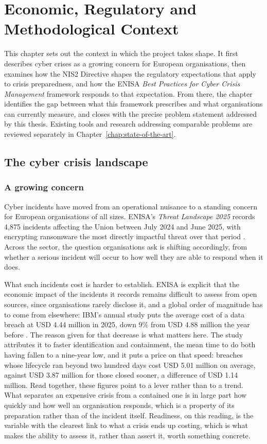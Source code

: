 \chapter{Economic, Regulatory and Methodological Context}
\label{chap:context}

This chapter sets out the context in which the project takes shape. It first
describes cyber crises as a growing concern for European organisations, then
examines how the NIS2 Directive shapes the regulatory expectations that apply
to crisis preparedness, and how the ENISA \emph{Best Practices for Cyber
Crisis Management} framework responds to that expectation. From there, the
chapter identifies the gap between what this framework prescribes and what
organisations can currently measure, and closes with the precise problem
statement addressed by this thesis. Existing tools and research addressing
comparable problems are reviewed separately in Chapter~\ref{chap:state-of-the-art}.

\section{The cyber crisis landscape}
\label{sec:crisis-landscape}

\subsection{A growing concern}

Cyber incidents have moved from an operational nuisance to a standing concern
for European organisations of all sizes. ENISA's \emph{Threat Landscape 2025}
records 4,875 incidents affecting the Union between July 2024 and June 2025,
with encrypting ransomware the most directly impactful threat over that
period \cite{enisa_threat_landscape_2025}. Across the sector, the question
organisations ask is shifting accordingly, from whether a serious incident
will occur to how well they are able to respond when it does.

What such incidents cost is harder to establish. ENISA is explicit that the
economic impact of the incidents it records remains difficult to assess from
open sources, since organisations rarely disclose it, and a global order of
magnitude has to come from elsewhere: IBM's annual study puts the average
cost of a data breach at USD 4.44 million in 2025, down 9\% from USD 4.88
million the year before \cite{ibm_cost_data_breach_2025}. The reason given
for that decrease is what matters here. The study attributes it to faster
identification and containment, the mean time to do both having fallen to a
nine-year low, and it puts a price on that speed: breaches whose lifecycle
ran beyond two hundred days cost USD 5.01 million on average, against
USD 3.87 million for those closed sooner, a difference of USD 1.14 million.
Read together, these figures point to a lever rather than to a trend. What
separates an expensive crisis from a contained one is in large part how
quickly and how well an organisation responds, which is a property of its
preparation rather than of the incident itself. Readiness, on this reading,
is the variable with the clearest link to what a crisis ends up costing,
which is what makes the ability to assess it, rather than assert it, worth
something concrete.

